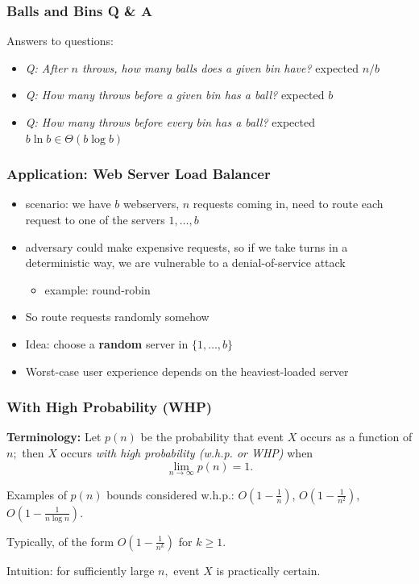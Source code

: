 \documentclass[10pt]{beamer}
\begin{document}
\begin{frame} \frametitle{Balls and Bins Q \& A}
Answers to questions:
\begin{itemize}
  \item \emph{Q: After $n$ throws, how many balls does a given bin have?} expected $n/b$
  \item \emph{Q: How many throws before a given bin has a ball?} expected $b$
  \item \emph{Q: How many throws before every bin has a ball?} expected $b \ln b \in \Theta(b \log b)$
\end{itemize}
\end{frame}

\begin{frame} \frametitle{Application: Web Server Load Balancer}
  \begin{itemize}
    \item scenario: we have $b$ webservers, $n$ requests coming in, need to route
      each request to one of the servers $1, \ldots, b$
    \item adversary could make expensive requests, so if we take turns in a deterministic
      way, we are vulnerable to a denial-of-service attack
      \begin{itemize}
        \item example: round-robin
      \end{itemize}
    \item So route requests randomly somehow
    \item Idea: choose a \textbf{random} server in $\{1, \ldots, b\}$
    \item Worst-case user experience depends on the heaviest-loaded server
  \end{itemize}
\end{frame}

\begin{frame} \frametitle{With High Probability (WHP)}

\textbf{Terminology:} Let $p(n)$ be the probability that event $X$ occurs as a function of $n;$
then $X$ occurs \emph{with high probability (w.h.p. or WHP)} when
\[ \lim_{n \rightarrow \infty} p(n) = 1. \]

Examples of $p(n)$ bounds considered w.h.p.: $O(1-\frac{1}{n})$, $O(1-\frac{1}{n^2})$, $O(1-\frac{1}{n \log n}).$
\vspace{12pt}

Typically, of the form $O(1-\frac{1}{n^k})$ for $k \geq 1.$
\vspace{12pt}

Intuition: for sufficiently large $n,$ event $X$ is practically certain.
\end{frame}
\end{document}
